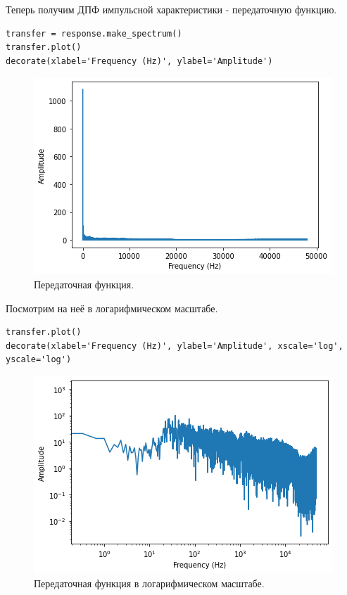 \documentclass[a4paper, 14pt]{extarticle}
\begin{document}
    Теперь получим ДПФ импульсной характеристики - передаточную функцию.

    \begin{lstlisting}[caption= Получение передаточной функции., label={lst:task2_transfer}]
transfer = response.make_spectrum()
transfer.plot()
decorate(xlabel='Frequency (Hz)', ylabel='Amplitude')   \end{lstlisting}

    \begin{figure}[H]
        \centering
        \includegraphics[width=0.7\linewidth]{resources/Images/task2_transfer}
        \caption{Передаточная функция.}
        \label{fig:task2_transfer}
    \end{figure}

    Посмотрим на неё в логарифмическом масштабе.

    \begin{lstlisting}[caption= Преобразование передаточной функции в логарифмичский масштаб., label={lst:task2_transfer_log}]
transfer.plot()
decorate(xlabel='Frequency (Hz)', ylabel='Amplitude', xscale='log', yscale='log')   \end{lstlisting}

    \begin{figure}[H]
        \centering
        \includegraphics[width=0.7\linewidth]{resources/Images/task2_transfer_log}
        \caption{Передаточная функция в логарифмическом масштабе.}
        \label{fig:task2_transfer_log}
    \end{figure}
\end{document}
